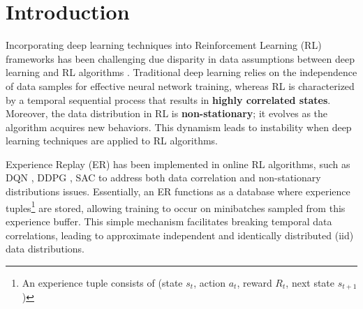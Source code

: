 
\chapter{Introduction}
\label{sec:introduction}

Incorporating deep learning techniques into Reinforcement Learning (RL) frameworks has been challenging due disparity in data assumptions between deep learning and RL algorithms \cite{mnih2013playing}. Traditional deep learning relies on the independence of data samples for effective neural network training, whereas RL is characterized by a temporal sequential process that results in \textbf{highly correlated states}. Moreover, the data distribution in RL is \textbf{non-stationary}; it evolves as the algorithm acquires new behaviors. This dynamism leads to instability when deep learning techniques are applied to RL algorithms. 


Experience Replay (ER) has been implemented in online RL algorithms, such as DQN \cite{mnih2013playing}, DDPG \cite{lillicrap2015continuous}, SAC \cite{haarnoja2018soft} to address both data correlation and non-stationary distributions issues. Essentially, an ER functions as a database where experience tuples\footnote[2]{An experience tuple consists of (state $s_{t}$, action $a_{t}$, reward $R_{t}$, next state $s_{t+1}$)} are stored, allowing training to occur on minibatches sampled from this experience buffer. This simple mechanism facilitates breaking temporal data correlations, leading to approximate independent and identically distributed (iid) data distributions.

